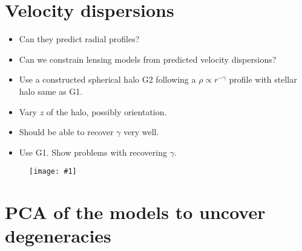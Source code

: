 \documentclass[onecolumn,galley]{mn2e}
\newcommand\plotone[1]{%
 \centering
 \leavevmode
 \texttt{[image: \#1]}%
}%
\begin{document}

\section{Velocity dispersions}
\begin{itemize}
\item Can they predict radial profiles?
\item Can we constrain lensing models from predicted velocity dispersions?
\item Use a constructed spherical halo G2 following a $\rho \propto r^{-\gamma}$ profile with stellar halo same as G1.
\item Vary $z$ of the halo, possibly orientation.
\item Should be able to recover $\gamma$ very well.
\item Use G1. Show problems with recovering $\gamma$.
\end{itemize}

\begin{figure}
\plotone{sigma_beta.pdf}
\caption{}
\end{figure}



\section{PCA of the models to uncover degeneracies}


\appendix
\end{document}
